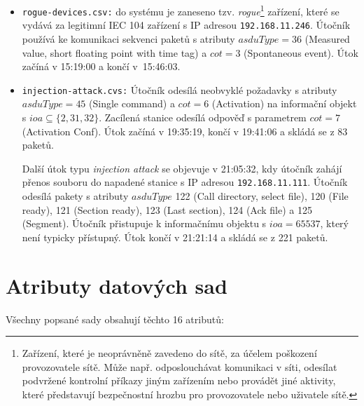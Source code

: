 \begin{itemize}
    \item \texttt{rogue-devices.csv:}
    do systému je zaneseno tzv. \emph{rogue}\footnote{Zařízení, které je neoprávněně zavedeno do sítě, za účelem poškození provozovatele sítě. Může např. odposlouchávat komunikaci v síti, odesílat podvržené kontrolní příkazy jiným zařízením nebo provádět jiné aktivity, které představují bezpečnostní hrozbu pro provozovatele nebo uživatele sítě.} zařízení, které se vydává za legitimní IEC 104 zařízení s IP adresou \texttt{192.168.11.246}. Útočník používá ke komunikaci sekvenci paketů s atributy $asduType=36$ (Measured value, short floating point with time tag) a $cot=3$ (Spontaneous event). Útok začíná v 15:19:00 a končí v~15:46:03.
    
    \item \texttt{injection-attack.cvs:}
    Útočník odesílá neobvyklé požadavky s atributy $asduType=45$ (Single command) a $cot=6$ (Activation) na informační objekt s $ioa \subseteq \{2, 31, 32 \}$. Zacílená stanice odesílá odpověď s parametrem $cot=7$ (Activation Conf). Útok začíná v 19:35:19, končí v 19:41:06 a skládá se z 83 paketů.
    
    Další útok typu \emph{injection attack} se objevuje v 21:05:32, kdy útočník zahájí přenos souboru do napadené stanice s IP adresou \texttt{192.168.11.111}. Útočník odesílá pakety s atributy $asduType$ 122 (Call directory, select file), 120 (File ready), 121 (Section ready), 123 (Last section), 124 (Ack file) a 125 (Segment). Útočník přistupuje k informačnímu objektu s $ioa=65537$, který není typicky přístupný. Útok končí v 21:21:14 a skládá se z 221 paketů.
\end{itemize}



\section{Atributy datových sad}

Všechny popsané sady obsahují těchto 16 atributů:


